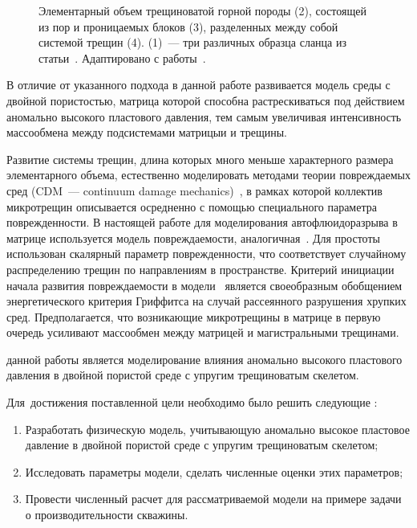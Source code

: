 \begin{figure}[ht]
  \caption{Элементарный объем трещиноватой горной породы (2), состоящей из пор и проницаемых блоков (3), разделенных между собой системой трещин (4). (1)~--- три различных образца сланца из статьи~\autocite{ye2016fracture}. Адаптировано с работы~\autocite{abousleiman2005poromechanics}.}
  \label{fig:barenblat}
\end{figure}

В отличие от указанного подхода в данной работе развивается модель среды с двойной пористостью, матрица которой способна растрескиваться под действием аномально высокого пластового давления, тем самым увеличивая интенсивность массообмена между подсистемами матрицыи и трещины.

Развитие системы трещин, длина которых много меньше характерного размера элементарного объема, естественно моделировать методами теории повреждаемых сред (CDM~--- continuum damage mechanics)~\autocite{lemaitre2012course, murakami2012continuum}, в рамках которой коллектив микротрещин описывается осредненно с помощью специального параметра поврежденности. В настоящей работе для моделирования автофлюидоразрыва в матрице используется модель повреждаемости, аналогичная~\autocite{kondaurov2007, izvekov2009, izvekov2010}. Для простоты использован скалярный параметр поврежденности, что соответствует случайному распределению трещин по направлениям в пространстве. Критерий инициации начала развития повреждаемости в модели~\autocite{kondaurov2007, izvekov2009, izvekov2010} является своеобразным обобщением энергетического критерия Гриффитса на случай рассеянного разрушения хрупких сред. Предполагается, что возникающие микротрещины в матрице в первую очередь усиливают массообмен между матрицей и магистральными трещинами.




{\aim} данной работы является моделирование влияния аномально высокого пластового давления в двойной пористой среде с упругим трещиноватым скелетом.

Для~достижения поставленной цели необходимо было решить следующие {\tasks}:
\begin{enumerate}
  \item Разработать физическую модель, учитывающую аномально высокое пластовое давление в двойной пористой среде с упругим трещиноватым скелетом;
  \item Исследовать параметры модели, сделать численные оценки этих параметров;
  \item Провести численный расчет для рассматриваемой модели на примере задачи о производительности скважины.
\end{enumerate}



